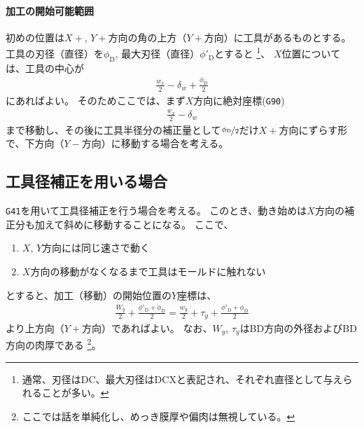 \paragraph*{加工の開始可能範囲}\noindent
初めの位置は$X+$, $Y+$方向の角の上方（$Y+$方向）に工具があるものとする。
工具の刃径（直径）を$\phi_\mathrm D$, 最大刃径（直径）$\phi'_\mathrm D$とすると
\footnote{通常、刃径はDC、最大刃径はDCXと表記され、それぞれ直径として与えられることが多い。}、
$X$位置については、工具の中心が
\begin{align}
  \label{eq:tanmenKakouStartX}
  \frac{w_x}2-\delta_w+\frac{\phi_\mathrm D}2
\end{align}
にあればよい。
そのためここでは、まず$X$方向に絶対座標(\verb|G90|)
\begin{align*}
  \frac{w_x}2-\delta_w
\end{align*}
まで移動し、その後に工具半径分の補正量として$\nicefrac{\phi_\mathrm D}2$だけ$X+$方向にずらす形で、下方向（$Y-$方向）に移動する場合を考える。



\subsection{工具径補正を用いる場合}
\verb|G41|を用いて工具径補正を行う場合を考える。
このとき、動き始めは$X$方向の補正分も加えて斜めに移動することになる。
ここで、
\begin{enumerate}
\item $X$, $Y$方向には同じ速さで動く
\item $X$方向の移動がなくなるまで工具はモールドに触れない
\end{enumerate}
とすると、加工（移動）の開始位置の$Y$座標は、
\begin{align*}
  \frac{W_y}2+\frac{\phi'_\mathrm D+\phi_\mathrm D}2
  = \frac{w_y}2+\tau_y+\frac{\phi'_\mathrm D+\phi_\mathrm D}2
\end{align*}
より上方向（$Y+$方向）であればよい。
なお、$W_y$, $\tau_y$はBD方向の外径およびBD方向の肉厚である
\footnote{ここでは話を単純化し、めっき膜厚や偏肉は無視している。}。



